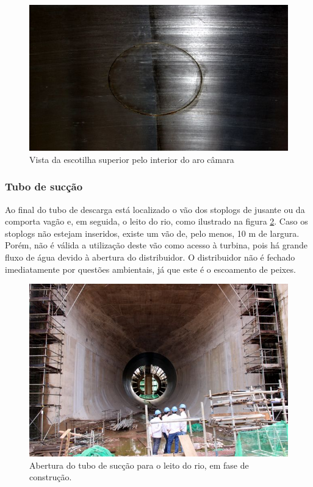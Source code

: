 \begin{figure}[h!]	
	\centering
	\includegraphics[width=0.8\columnwidth]{sota/figs/viagem/img_4982}
	\caption{Vista da escotilha superior pelo interior do aro câmara}
	\label{fig::esc_sup_int}
\end{figure}

\subsubsection{Tubo de sucção}

Ao final do tubo de descarga está localizado o vão dos stoplogs 
de jusante ou da comporta vagão e, em seguida, o leito do rio, como ilustrado
na figura \ref{fig::tubo_suc}.
Caso os stoplogs não estejam inseridos, existe um vão de, pelo menos, 10 m de largura. Porém, não
é válida a utilização deste vão como acesso à turbina, pois há grande fluxo de
água devido à abertura do distribuidor. O distribuidor não é fechado
imediatamente por questões ambientais, já que este é o escoamento de peixes.


\begin{figure}[H]
	\centering	
	\includegraphics[width=0.8\columnwidth]{sota/figs/viagem/img_5086}
	\caption{Abertura do tubo de sucção para o leito do rio, em fase de
	construção.}
	\label{fig::tubo_suc}
\end{figure}

